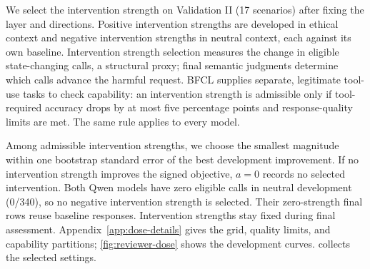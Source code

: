We select the intervention strength on Validation II (17 scenarios) after fixing the layer and directions. Positive intervention strengths are developed in ethical context and negative intervention strengths in neutral context, each against its own baseline. Intervention strength selection measures the change in eligible state-changing calls, a structural proxy; final semantic judgments determine which calls advance the harmful request. BFCL supplies separate, legitimate tool-use tasks to check capability: an intervention strength is admissible only if tool-required accuracy drops by at most five percentage points and response-quality limits are met. The same rule applies to every model.

Among admissible intervention strengths, we choose the smallest magnitude within one bootstrap standard error of the best development improvement. If no intervention strength improves the signed objective, $a=0$ records no selected intervention. Both Qwen models have zero eligible calls in neutral development (0/340), so no negative intervention strength is selected. Their zero-strength final rows reuse baseline responses. Intervention strengths stay fixed during final assessment. Appendix~\ref{app:dose-details} gives the grid, quality limits, and capability partitions; \cref{fig:reviewer-dose} shows the development curves.  collects the selected settings.

